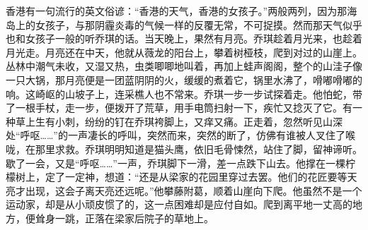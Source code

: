 \par 香港有一句流行的英文俗谚：“香港的天气，香港的女孩子。”两般两列，因为那海岛上的女孩子，与那阴霾炎毒的气候一样的反覆无常，不可捉摸。然而那天气似乎也和女孩子一般的听乔琪的话。当天晚上，果然有月亮。乔琪趁着月光来，也趁着月光走。月亮还在中天，他就从薇龙的阳台上，攀着树桠枝，爬到对过的山崖上。丛林中潮气未收，又湿又热，虫类唧唧地叫着，再加上蛙声阁阁，整个的山洼子像一只大锅，那月亮便是一团蓝阴阴的火，缓缓的煮着它，锅里水沸了，嗗嘟嗗嘟的响。这崎岖的山坡子上，连采樵人也不常来。乔琪一步一步试探着走。他怕蛇，带了一根手杖，走一步，便拨开了荒草，用手电筒扫射一下，疾忙又捻灭了它。有一种草上生有小刺，纷纷的钉在乔琪袴脚上，又痒又痛。正走着，忽然听见山深处“呼呕……”的一声凄长的呼叫，突然而来，突然的断了，仿佛有谁被人叉住了喉咙，在那里求救。乔琪明明知道是猫头鹰，依旧毛骨悚然，站住了脚，留神谛听。歇了一会，又是“呼呕……”一声，乔琪脚下一滑，差一点跌下山去。他撑在一棵柠檬树上，定了一定神，想道：“还是从梁家的花园里穿过去罢。他们的花匠要等天亮才出现，这会子离天亮还远呢。”他攀藤附葛，顺着山崖向下爬。他虽然不是一个运动家，却是从小顽皮惯了的，这一点困难却是应付自如。爬到离平地一丈高的地方，便耸身一跳，正落在梁家后院子的草地上。
